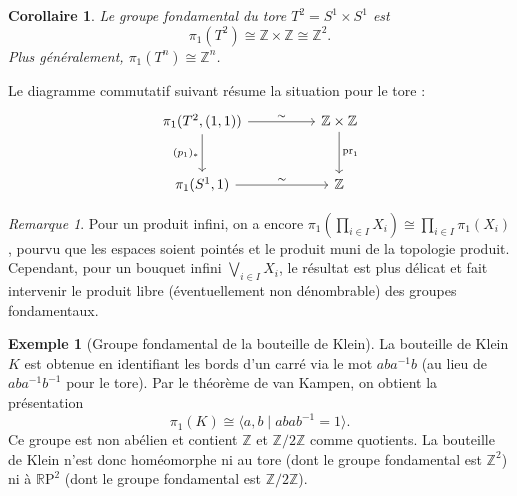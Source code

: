 \documentclass[12pt,a4paper,openany]{book}
\theoremstyle{definition}
\newtheorem{exemple}[definition]{Exemple}
\theoremstyle{plain}
\newtheorem{corollaire}[definition]{Corollaire}
\theoremstyle{remark}
\newtheorem{remarque}[definition]{Remarque}
\newcommand{\Z}{\mathbb{Z}}
\newcommand{\RP}{\mathbb{R}\mathrm{P}}
\begin{document}
\begin{corollaire}\label{cor:pi1-tore}
Le groupe fondamental du tore $T^2 = S^1 \times S^1$ est
\[
\pi_1(T^2) \cong \Z \times \Z \cong \Z^2.
\]
Plus généralement, $\pi_1(T^n) \cong \Z^n$.
\end{corollaire}

Le diagramme commutatif suivant résume la situation pour le tore :
\[
\begin{tikzcd}[column sep=huge, row sep=large]
\pi_1(T^2, (1,1)) \arrow[r, "\sim"] \arrow[d, "(p_1)_*"'] & \Z \times \Z \arrow[d, "\mathrm{pr}_1"] \\
\pi_1(S^1, 1) \arrow[r, "\sim"] & \Z
\end{tikzcd}
\]

\begin{remarque}\label{rem:pi1-produit-infini}
Pour un produit infini, on a encore
$\pi_1\!\left(\prod_{i \in I} X_i\right) \cong \prod_{i \in I} \pi_1(X_i)$,
pourvu que les espaces soient pointés et le produit muni de la topologie produit.
Cependant, pour un bouquet infini $\bigvee_{i \in I} X_i$, le résultat est plus
délicat et fait intervenir le produit libre (éventuellement non dénombrable) des
groupes fondamentaux.
\end{remarque}

\begin{exemple}[Groupe fondamental de la bouteille de Klein]\label{ex:pi1-klein}
La bouteille de Klein $K$ est obtenue en identifiant les bords d'un carré via
le mot $aba^{-1}b$ (au lieu de $aba^{-1}b^{-1}$ pour le tore). Par le théorème
de van Kampen, on obtient la présentation
\[
\pi_1(K) \cong \langle a, b \mid abab^{-1} = 1 \rangle.
\]
Ce groupe est non abélien et contient $\Z$ et $\Z/2\Z$ comme quotients. La
bouteille de Klein n'est donc homéomorphe ni au tore (dont le groupe fondamental
est $\Z^2$) ni à $\RP^2$ (dont le groupe fondamental est $\Z/2\Z$).
\end{exemple}
\end{document}
